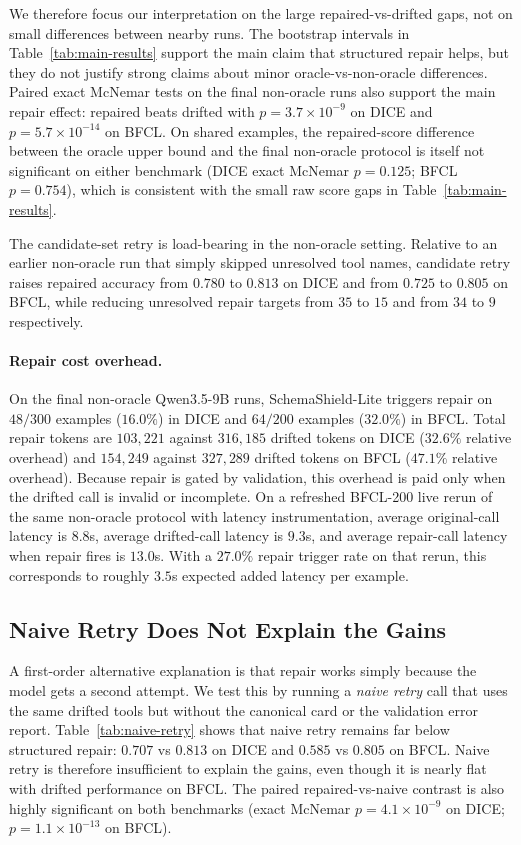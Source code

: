 \documentclass[runningheads]{llncs}
\newcommand{\method}{SchemaShield-Lite\xspace}
\begin{document}
We therefore focus our interpretation on the large repaired-vs-drifted gaps, not on
small differences between nearby runs. The bootstrap intervals in
Table~\ref{tab:main-results} support the main claim that structured repair helps,
but they do not justify strong claims about minor oracle-vs-non-oracle differences.
Paired exact McNemar tests on the final non-oracle runs also support the main
repair effect: repaired beats drifted with $p=3.7\times 10^{-9}$ on DICE and
$p=5.7\times 10^{-14}$ on BFCL. On shared examples, the repaired-score difference
between the oracle upper bound and the final non-oracle protocol is itself not
significant on either benchmark (DICE exact McNemar $p=0.125$; BFCL
$p=0.754$), which is consistent with the small raw score gaps in
Table~\ref{tab:main-results}.

The candidate-set retry is load-bearing in the non-oracle setting. Relative to an
earlier non-oracle run that simply skipped unresolved tool names, candidate retry
raises repaired accuracy from $0.780$ to $0.813$ on DICE and from $0.725$ to
$0.805$ on BFCL, while reducing unresolved repair targets from $35$ to $15$ and
from $34$ to $9$ respectively.

\paragraph{Repair cost overhead.}
On the final non-oracle Qwen3.5-9B runs, \method triggers repair on $48/300$
examples ($16.0\%$) in DICE and $64/200$ examples ($32.0\%$) in BFCL. Total repair
tokens are $103{,}221$ against $316{,}185$ drifted tokens on DICE ($32.6\%$
relative overhead) and $154{,}249$ against $327{,}289$ drifted tokens on BFCL
($47.1\%$ relative overhead). Because repair is gated by validation, this overhead
is paid only when the drifted call is invalid or incomplete. On a refreshed
BFCL-200 live rerun of the same non-oracle protocol with latency instrumentation,
average original-call latency is $8.8$s, average drifted-call latency is $9.3$s,
and average repair-call latency when repair fires is $13.0$s. With a $27.0\%$
repair trigger rate on that rerun, this corresponds to roughly $3.5$s expected
added latency per example.

\subsection{Naive Retry Does Not Explain the Gains}
\label{sec:naive-retry}
A first-order alternative explanation is that repair works simply because the model
gets a second attempt. We test this by running a \emph{naive retry} call that uses
the same drifted tools but without the canonical card or the validation error
report. Table~\ref{tab:naive-retry} shows that naive retry remains far below
structured repair: $0.707$ vs $0.813$ on DICE and $0.585$ vs $0.805$ on BFCL.
Naive retry is therefore insufficient to explain the gains, even though it is nearly
flat with drifted performance on BFCL. The paired repaired-vs-naive contrast is
also highly significant on both benchmarks (exact McNemar $p=4.1\times 10^{-9}$
on DICE; $p=1.1\times 10^{-13}$ on BFCL).
\end{document}
